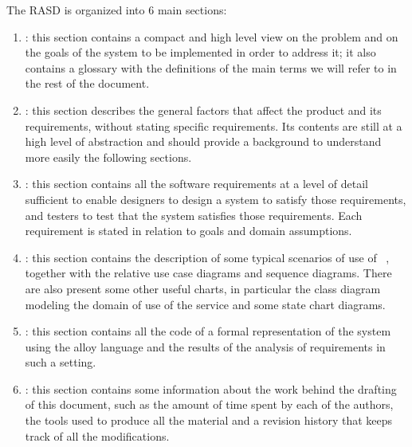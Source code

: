The RASD is organized into 6 main sections:

\begin{enumerate}
\item {\textbf{}}: this section contains a compact and high level view on the problem and on the goals of the system to be implemented in order to address it; it also contains a glossary with the definitions of the main terms we will refer to in the rest of the document.
\item {\textbf{}}: this section  describes the general factors that affect the product and its requirements, without stating specific requirements. Its contents are still at a high level of abstraction and should provide a background to understand more easily the following sections.
\item {\textbf{}}: this section contains all the software requirements at a level of detail sufficient to enable designers to design a system to satisfy those requirements, and testers to test that the system satisfies those requirements. Each requirement is stated in relation to goals and domain assumptions.
\item {\textbf{}}: this section contains the description of some typical scenarios of use of \projectname~, together with the relative use case diagrams and sequence diagrams. There are also present some other useful charts, in particular the class diagram modeling the domain of use of the service and some state chart diagrams.
\item {\textbf{}}: this section contains all the code of a formal representation of the system using the alloy language and the results of the analysis of requirements in such a setting.
\item {\textbf{}}: this section contains some information about the work behind the drafting of this document, such as the amount of time spent by each of the authors, the tools used to produce all the material and a revision history that keeps track of all the modifications.
\end{enumerate}